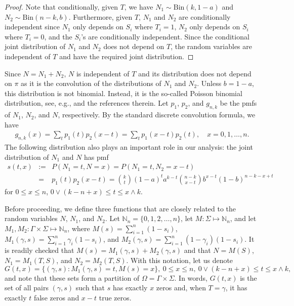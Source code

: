 \documentclass[a4paper,11pt]{article}
\newcommand{\dst}{distribution }
\begin{document}
\begin{proof}
Note that conditionally, given $T$, we have $N_1\sim \mathrm{Bin}(k,1-a)$ and $N_2 \sim \mathrm{Bin}(n-k,b)$. Furthermore, given $T$, $N_1$ and $N_2$ are conditionally independent since $N_1$ only depends on $S_i$ where $T_i=1$, $N_2$ only depends on $S_i$ where $T_i=0$, and the $S_i$'s are conditionally independent. Since the conditional joint distribution of $N_1$ and $N_2$ does not depend on $T$, the random variables are independent of $T$ and have the required joint distribution.
\end{proof}

Since $N=N_1+N_2$, $N$ is independent of $T$ and its distribution does not depend on $\pi$ as it is the convolution of the distributions of $N_1$ and $N_2$. Unless $b=1-a$, this distribution is not binomial. Instead, it is the so-called Poisson binomial distribution, see, e.g., \cite{Hong:2013} and the references therein. Let  $p_1$, $p_2$, and $g_{n,k}$ be the pmfs of $N_1$, $N_2$, and $N$, respectively. By the standard discrete convolution formula, we have
\begin{eqnarray}
g_{n,k}(x)=\sum_{t} p_1(t)p_2(x-t) = \sum_{t}p_1(x-t)p_2(t), \quad x =0,1,\dots, n. \label{con}
\end{eqnarray}
The following distribution also plays an important role in our analysis: the joint \dst of $N_1$ and $N$ has pmf
\begin{eqnarray}
s(t,x) &:=& P(N_1=t,N=x)= P(N_1=t,N_2=x-t)\nonumber \\
&=& p_1(t)p_2(x-t)={k\choose t}(1-a)^ta^{k-t}{n-k\choose x-t} b^{x-t}(1-b)^{n-k-x+t}
\label{stx}
\end{eqnarray}
for $0\leq x\leq n$, $0\vee(k-n+x)\le t\le x\wedge k$.

Before proceeding, we define three functions that are closely related to the random variables $N$, $N_1$, and $N_2$. Let $\mathbb N_n=\{0,1,2,\dots,n\}$, let $M:\Sigma\mapsto\mathbb N_n$, and let $M_1,M_2:\Gamma\times\Sigma\mapsto\mathbb N_n$, where $M(s)=\sum_{i=1}^n (1-s_i)$, $M_1(\gamma,s)=\sum_{i=1}^n \gamma_i (1-s_i)$, and $M_2(\gamma,s) = \sum_{i=1}^n (1-\gamma_i) (1-s_i)$.  It is readily checked that $M(s)=M_1(\gamma,s)+M_2(\gamma,s)$ and that $N=M(S)$, $N_1 = M_1(T,S)$, and $N_2=M_2(T,S)$.  With this notation, let us denote 
$$
G(t,x)=\{(\gamma,s): M_1(\gamma,s)=t, M(s)=x\}, \ 0\leq x\leq n, \ 0\vee(k-n+x)\le t\le x\wedge k, 
$$
and note that these sets form a partition of $\Omega=\Gamma\times \Sigma$. In words, $G(t,x)$ is the set of all pairs $(\gamma,s)$ such that $s$ has exactly $x$ zeros and, when $T=\gamma$, it has exactly $t$ false zeros and $x-t$ true zeros.
\end{document}
